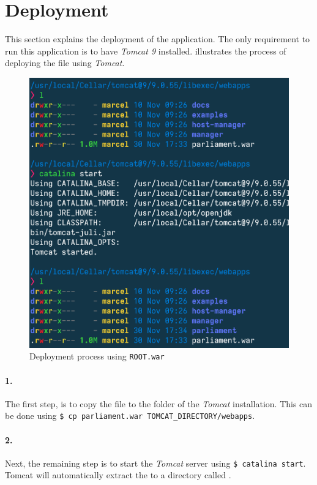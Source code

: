 \section{Deployment}\label{sec:03_depl}
This section explains the deployment of the application.
The only requirement to run this application is to have \textit{Tomcat 9} installed.
 illustrates the process of deploying the  file using \textit{Tomcat}.
\begin{figure}[h]
\centering
\includegraphics[scale=0.5]{images/03_depl/process}
\caption{Deployment process using \texttt{ROOT.war}}
\label{fig:subsubsec:03_depl_process}
\end{figure}

\paragraph{1.}
The first step, is to copy the  file to the  folder of the \textit{Tomcat} installation.\newline
This can be done using \texttt{\$ cp parliament.war TOMCAT\_DIRECTORY/webapps}.

\paragraph{2.}
Next, the remaining step is to start the \textit{Tomcat} server using \texttt{\$ catalina start}. Tomcat will automatically extract the  to a directory called .

